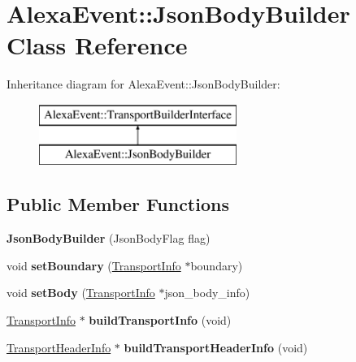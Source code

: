 \hypertarget{classAlexaEvent_1_1JsonBodyBuilder}{}\section{Alexa\+Event\+:\+:Json\+Body\+Builder Class Reference}
\label{classAlexaEvent_1_1JsonBodyBuilder}
Inheritance diagram for Alexa\+Event\+:\+:Json\+Body\+Builder\+:\begin{figure}[H]
\begin{center}
\leavevmode
\includegraphics[height=2.000000cm]{d4/db2/classAlexaEvent_1_1JsonBodyBuilder}
\end{center}
\end{figure}
\subsection*{Public Member Functions}
\begin{DoxyCompactItemize}
\item 
\mbox{\label{classAlexaEvent_1_1JsonBodyBuilder_a9616f6be848755262c91875f1d249c78}} 
{\bfseries Json\+Body\+Builder} (Json\+Body\+Flag flag)
\item 
\mbox{\label{classAlexaEvent_1_1JsonBodyBuilder_a0ac9f1fef1481ea55bef87ee0ad7011a}} 
void {\bfseries set\+Boundary} (\hyperlink{classAlexaEvent_1_1TransportInfo}{Transport\+Info} $\ast$boundary)
\item 
\mbox{\label{classAlexaEvent_1_1JsonBodyBuilder_adfc463b9d028bc5716c22ab9952e002a}} 
void {\bfseries set\+Body} (\hyperlink{classAlexaEvent_1_1TransportInfo}{Transport\+Info} $\ast$json\+\_\+body\+\_\+info)
\item 
\mbox{\label{classAlexaEvent_1_1JsonBodyBuilder_ab15908e4865735a2a705ef68dc19c9d4}} 
\hyperlink{classAlexaEvent_1_1TransportInfo}{Transport\+Info} $\ast$ {\bfseries build\+Transport\+Info} (void)
\item 
\mbox{\label{classAlexaEvent_1_1JsonBodyBuilder_a3aa89bcd0fcb37699f16ab1e1fd726d0}} 
\hyperlink{classAlexaEvent_1_1TransportHeaderInfo}{Transport\+Header\+Info} $\ast$ {\bfseries build\+Transport\+Header\+Info} (void)
\end{DoxyCompactItemize}


